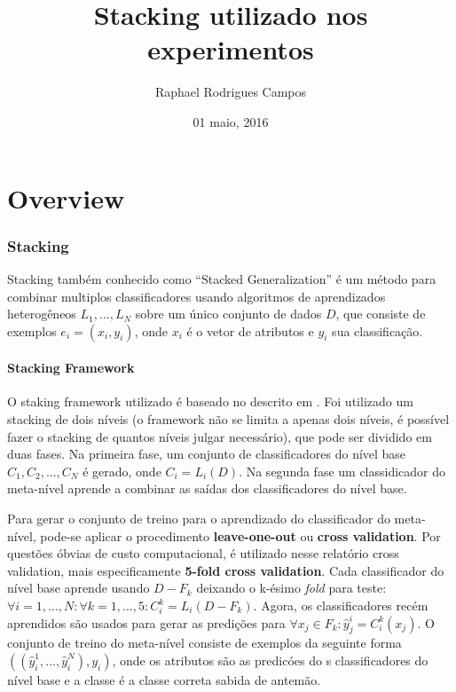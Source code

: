 \documentclass[]{article}
\title{Stacking utilizado nos experimentos}
\author{Raphael Rodrigues Campos}
\date{01 maio, 2016}
\begin{document}
\maketitle


\chapter{Overview}

\subsection{Stacking}\label{stacking}

Stacking também conhecido como ``Stacked Generalization'' é um método
para combinar multiplos classificadores usando algoritmos de
aprendizados heterogêneos \(L_1, ..., L_N\) sobre um único conjunto de
dados \(D\), que consiste de exemplos \(e_i = (x_i, y_i)\), onde \(x_i\)
é o vetor de atributos e \(y_i\) sua classificação.

\subsubsection{Stacking Framework}\label{stacking-framework}

O staking framework utilizado é baseado no descrito em
\citep{Wolpert92stackedgeneralization}. Foi utilizado um stacking de
dois níveis (o framework não se limita a apenas dois níveis, é possível
fazer o stacking de quantos níveis julgar necessário), que pode ser
dividido em duas fases. Na primeira fase, um conjunto de classificadores
do nível base \(C_1, C_2, ..., C_N\) é gerado, onde \(C_i = L_i(D)\). Na
segunda fase um classidicador do meta-nível aprende a combinar as saídas
dos classificadores do nível base.

Para gerar o conjunto de treino para o aprendizado do classificador do
meta-nível, pode-se aplicar o procedimento \textbf{leave-one-out} ou
\textbf{cross validation}. Por questões óbvias de custo computacional, é
utilizado nesse relatório cross validation, mais especificamente
\textbf{5-fold cross validation}. Cada classificador do nível base
aprende usando \(D - F_k\) deixando o k-ésimo \emph{fold} para teste:
\(\forall i = 1,...,N : \forall k = 1,...,5 : C^{k}_i = L_i(D-F_k)\).
Agora, os classificadores recém aprendidos são usados para gerar as
predições para \(\forall x_j \in F_k:\hat{y}_j^i=C^k_i(x_j)\). O
conjunto de treino do meta-nível consiste de exemplos da seguinte forma
\(((\hat{y}_i^1,..., \hat{y}_i^N), y_i)\), onde os atributos são as
predicóes do s classificadores do nível base e a classe é a classe
correta sabida de antemão.
\end{document}
